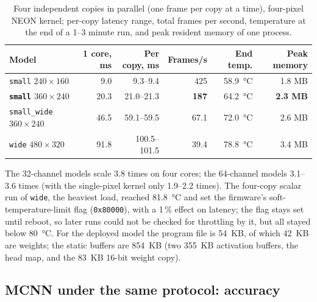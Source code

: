\documentclass[11pt,a4paper]{article}
\newcommand{\cfg}[1]{\texttt{#1}}
\begin{document}
\begin{table}[H]
\centering
\caption{Four independent copies in parallel (one frame per copy at a
time), four-pixel NEON kernel; per-copy latency range, total frames per
second, temperature at the end of a 1--3 minute run, and peak resident
memory of one process.}
\label{tab:fourcore}
\begin{tabular}{lrrrrr}
\toprule
Model & 1 core, ms & Per copy, ms & Frames/s & End temp. & Peak memory \\
\midrule
\cfg{small} $240{\times}160$ & 9.0 & 9.3--9.4 & 425 & \SI{58.9}{\celsius} & 1.8 MB \\
\textbf{\cfg{small} $360{\times}240$} & 20.3 & 21.0--21.3 & \textbf{187} & \SI{64.2}{\celsius} & \textbf{2.3 MB} \\
\cfg{small\_wide} $360{\times}240$ & 46.5 & 59.1--59.5 & 67.1 & \SI{72.0}{\celsius} & 2.6 MB \\
\cfg{wide} $480{\times}320$ & 91.8 & 100.5--101.5 & 39.4 & \SI{78.8}{\celsius} & 3.4 MB \\
\bottomrule
\end{tabular}
\end{table}

The 32-channel models scale 3.8 times on four cores; the 64-channel models
3.1--3.6 times (with the single-pixel kernel only 1.9--2.2 times). The
four-copy scalar run of \cfg{wide}, the heaviest load, reached
\SI{81.8}{\celsius} and set the firmware's soft-temperature-limit flag
(\texttt{0x80000}), with a 1\,\% effect on latency; the flag stays set
until reboot, so later runs could not be checked for throttling by it, but
all stayed below \SI{80}{\celsius}. For the deployed model the program
file is 54~KB, of which 42~KB are weights; the static buffers are 854~KB
(two 355~KB activation buffers, the head map, and the 83~KB 16-bit weight
copy).

\subsection{MCNN under the same protocol: accuracy}
\label{sec:mcnnacc}
\end{document}
